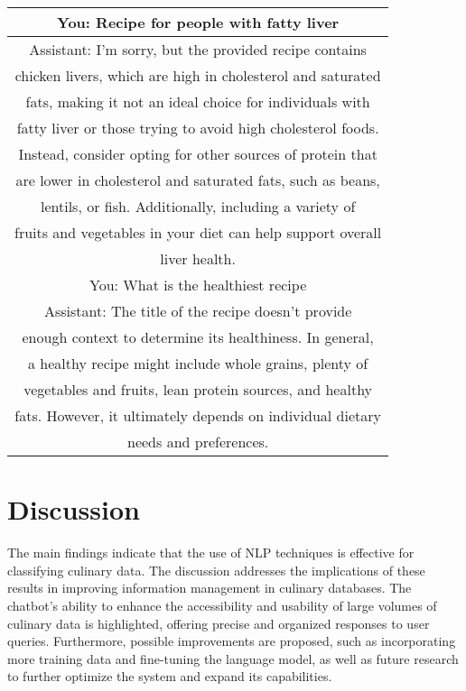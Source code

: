 \documentclass[conference]{IEEEtran}
\begin{document}
\begin{table}[ht]
    \centering
    \caption{}
    \label{tab:colored_responses}
    \begin{tabular}{|c|}
        \hline
        \rowcolor{lightgray} 
        You: Recipe for people with fatty liver \\
        \hline
        Assistant:  I'm sorry, but the provided recipe contains \\
        chicken livers, which are high in cholesterol and saturated\\
        fats, making it not an ideal choice for individuals with\\
        fatty liver or those trying to avoid high cholesterol foods.\\
        Instead, consider opting for other sources of protein that\\
        are lower in cholesterol and saturated fats, such as beans,\\
        lentils, or fish. Additionally, including a variety of\\
        fruits and vegetables in your diet can help support overall\\
        liver health.  \\
        \hline
        \rowcolor{lightgray} 
        You: What is the healthiest recipe \\
        \hline
        Assistant:  The title of the recipe doesn't provide \\
        enough context to determine its healthiness. In general,\\
        a healthy recipe might include whole grains, plenty of \\ 
        vegetables and fruits, lean protein sources, and healthy \\ 
        fats. However, it ultimately depends on individual dietary \\ 
        needs and preferences.\\
        \hline
    \end{tabular}
\end{table}

\section{Discussion}
The main findings indicate that the use of NLP techniques is effective for classifying culinary data. The discussion addresses the implications of these results in improving information management in culinary databases. The chatbot's ability to enhance the accessibility and usability of large volumes of culinary data is highlighted, offering precise and organized responses to user queries. Furthermore, possible improvements are proposed, such as incorporating more training data and fine-tuning the language model, as well as future research to further optimize the system and expand its capabilities.
\end{document}
